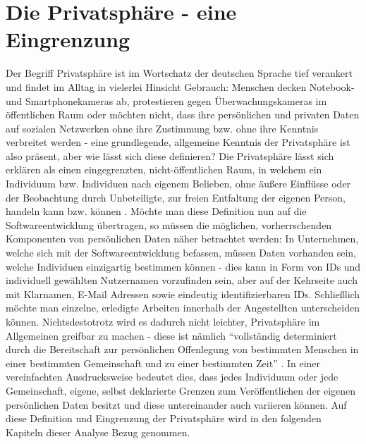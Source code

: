 \section{Die Privatsphäre - eine Eingrenzung}
Der Begriff Privatsphäre ist im Wortschatz der deutschen Sprache tief verankert und findet im Alltag in vielerlei Hinsicht Gebrauch: Menschen decken Notebook- und Smartphonekameras
ab, protestieren gegen Überwachungskameras im öffentlichen Raum \cite{Stallwood:2013aa} oder möchten nicht, dass ihre persönlichen und privaten Daten auf sozialen Netzwerken ohne ihre Zustimmung
bzw. ohne ihre Kenntnis verbreitet werden \cite{Picchi:2018aa} - eine grundlegende, allgemeine Kenntnis der Privatsphäre ist also präsent, aber wie lässt sich diese definieren? \newline
Die Privatsphäre lässt sich erklären als einen eingegrenzten, nicht-öffentlichen Raum, in welchem ein Individuum bzw. Individuen nach eigenem Belieben, ohne äußere Einflüsse oder der Beobachtung durch
Unbeteiligte, zur freien Entfaltung der eigenen Person, handeln kann bzw. können \cite*{Pettinger:2020aa}. Möchte man diese Definition nun auf die Softwareentwicklung übertragen, so müssen die möglichen, 
vorherrschenden Komponenten von persönlichen Daten näher betrachtet werden: In Unternehmen, welche sich mit der Softwareentwicklung befassen, müssen Daten vorhanden sein, welche Individuen einzigartig 
bestimmen können - dies kann in Form von IDs und individuell gewählten Nutzernamen vorzufinden sein, aber auf der Kehrseite auch mit Klarnamen, E-Mail Adressen sowie eindeutig identifizierbaren IDs. Schließlich 
möchte man einzelne, erledigte Arbeiten innerhalb der Angestellten unterscheiden können. \newline
Nichtsdestotrotz wird es dadurch nicht leichter, Privatsphäre im Allgemeinen greifbar zu machen - diese ist nämlich \enquote{vollständig determiniert durch die Bereitschaft zur persönlichen Offenlegung von bestimmten Menschen in einer
bestimmten Gemeinschaft und zu einer bestimmten Zeit} \cite{Miller:2000aa}. In einer vereinfachten Ausdrucksweise bedeutet dies, dass jedes Individuum oder jede Gemeinschaft, eigene, selbst deklarierte Grenzen zum Veröffentlichen
der eigenen persönlichen Daten besitzt und diese untereinander auch variieren können. \newline
Auf diese Definition und Eingrenzung der Privatsphäre wird in den folgenden Kapiteln dieser Analyse Bezug genommen.

